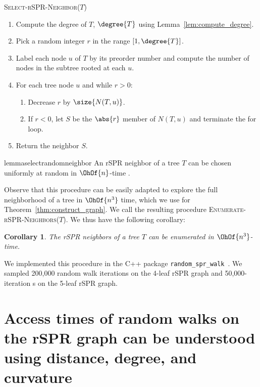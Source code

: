 \documentclass[11pt]{amsart}
\newtheorem{corollary}[theorem]{Corollary}
\newcommand{\cuttable}[2][]{%
    \ifthenelse{\equal{#1}{}}%
		{}%
		{#1}%
}
\begin{document}
\vspace{1em}
\textsc{Select-rSPR-Neighbor($T$)}
\begin{enumerate}[label={\arabic*}.]
	\item	Compute the degree of $T$, $\degree{T}$ using Lemma~\ref{lem:compute_degree}.
	\item Pick a random integer $r$ in the range $[1,\degree{T}]$.
	\item Label each node $u$ of $T$ by its preorder number and compute the number of nodes in the subtree rooted at each $u$.
\item For each tree node $u$ and while $r > 0$:
	\begin{enumerate}
		\item Decrease $r$ by $\size{N(T,u)}$.
		\item If $r < 0$, let $S$ be the $\abs{r}$ member of $N(T,u)$ and terminate the for loop.
	\end{enumerate}
\item Return the neighbor $S$.
\end{enumerate}

\begin{restatable}{lemma}{selectrandomneighbor}
	\label{lem:select_random_neighbor}
	An rSPR neighbor of a tree $T$ can be chosen uniformly at random in $\OhOf{n}$-time\cuttable{ using $\OhOf{n}$ space}.
\end{restatable}

Observe that this procedure can be easily adapted to explore the full neighborhood of a tree in $\OhOf{n^3}$ time, which we use for Theorem~\ref{thm:construct_graph}. We call the resulting procedure \textsc{Enumerate-rSPR-Neighbors($T$)}.
We thus have the following corollary:

\begin{corollary}
\label{cor:enumerate_neighbors}
	The rSPR neighbors of a tree $T$ can be enumerated in $\OhOf{n^3}$-time.
\end{corollary}

We implemented this procedure in the C++ package \texttt{random\_spr\_walk}~\cite{random_spr_walk}.
We sampled \cuttable{a }200,000\cuttable{-iteration} random walk\cuttable[ iterations]{} on the 4-leaf rSPR graph and \cuttable{a }50,000-iteration\cuttable[s]{ random walk} on the 5-leaf rSPR graph.

\section{Access times of random walks on the rSPR graph can be understood using distance, degree, and curvature}
\end{document}
